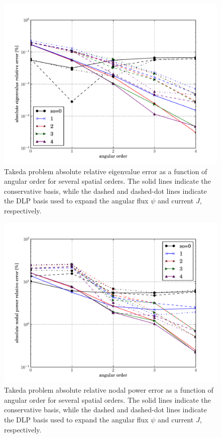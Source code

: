 \begin{figure}[ht]
    \centering
    \includegraphics[keepaspectratio, width = 3.5 in]
                    {takeda_order_study_eigenvalue_error}
    \caption{Takeda problem absolute relative eigenvalue error as 
             a function of angular order for several spatial orders.  
             The solid lines indicate the conservative basis, while the 
             dashed and dashed-dot lines indicate the DLP basis used to 
             expand the angular flux $\psi$ and current $J$, respectively.}
    \label{fig:takeda_order_study_eigenvalue_error}
\end{figure}

\begin{figure}[ht]
    \centering
    \includegraphics[keepaspectratio, width = 3.5 in]
                    {takeda_order_study_nodal_power_error}
    \caption{Takeda problem absolute relative nodal power error as 
             a function of angular order for several spatial orders.  
             The solid lines indicate the conservative basis, while the 
             dashed and dashed-dot lines indicate the DLP basis used to 
             expand the angular flux $\psi$ and current $J$, respectively.}
    \label{fig:takeda_order_study_nodal_power_error}
\end{figure}

